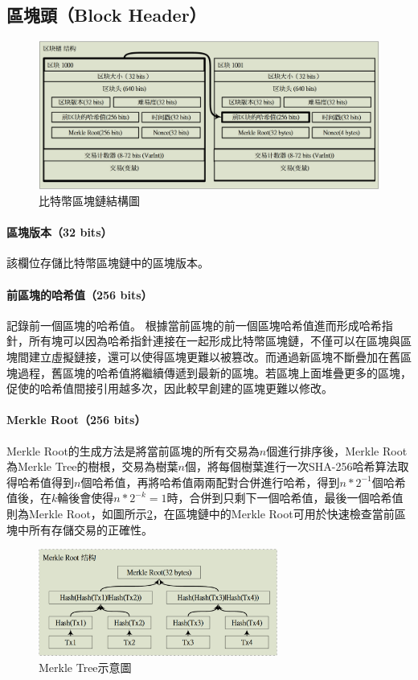 		\subsection{區塊頭（Block Header）}

		\begin{figure}[htbp]
			\centering
			\includegraphics[width = 1\textwidth]{blockchain.png}
			\caption{比特幣區塊鏈結構圖}\label{blockchain}
		\end{figure}

			\paragraph{區塊版本（32 bits）}該欄位存儲比特幣區塊鏈中的區塊版本。
			\paragraph{前區塊的哈希值（256 bits）}記錄前一個區塊的哈希值。 根據當前區塊的前一個區塊哈希值進而形成哈希指針，所有塊可以因為哈希指針連接在一起形成比特幣區塊鏈，不僅可以在區塊與區塊間建立虛擬鏈接，還可以使得區塊更難以被篡改。而通過新區塊不斷疊加在舊區塊過程，舊區塊的哈希值將繼續傳遞到最新的區塊。若區塊上面堆疊更多的區塊，促使的哈希值間接引用越多次，因此較早創建的區塊更難以修改。
			\paragraph{Merkle Root（256 bits）}Merkle Root的生成方法是將當前區塊的所有交易為$n$個進行排序後，Merkle Root為Merkle Tree的樹根，交易為樹葉$n$個，將每個樹葉進行一次SHA-256哈希算法取得哈希值得到$n$個哈希值，再將哈希值兩兩配對合併進行哈希，得到$n*2^{-1}$個哈希值後，在$k$輪後會使得$n*2^{-k}=1$時，合併到只剩下一個哈希值，最後一個哈希值則為Merkle Root，如圖所示\ref{MerkleRoot}，在區塊鏈中的Merkle Root可用於快速檢查當前區塊中所有存儲交易的正確性。

			\begin{figure}[htbp]
				\centering
				\includegraphics[width = 0.7\textwidth]{MerkleRoot.png}
				\caption{Merkle Tree示意圖}\label{MerkleRoot}
			\end{figure}


